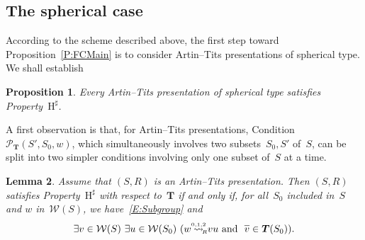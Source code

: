 \documentclass{amsart}
\numberwithin{equation}{section}
\theoremstyle{plain}
\newtheorem{prop}{Proposition}[section]
\newtheorem{lemm}[prop]{Lemma}
\theoremstyle{definition}
\begin{document}
\subsection{The spherical case}
\label{SS:SphericalPP}

According to the scheme described above, the first step toward Proposition~\ref{P:FCMain} is to consider Artin--Tits presentations of spherical type. We shall establish

\begin{prop}
\label{P:SphericalP}
Every Artin--Tits presentation of spherical type satisfies Property~${{\mathrm{H}}^\sharp}$.
\end{prop}

A first observation is that, for Artin--Tits presentations, Condition~${\mathcal{P}}_{\boldsymbol{T}}({S}', {S}_0, {w})$, which simultaneously involves two subsets~${S}_0, {S}'$ of~${S}$, can be split into two simpler conditions involving only one subset of~${S}$ at a time.

\begin{lemm}
\label{L:Propp}
Assume that $({S}, {R})$ is an Artin--Tits presentation. Then $({S}, {R})$ satisfies Property~${{\mathrm{H}}^\sharp}$ with respect to~${\boldsymbol{T}}$ if and only if, for all~${S}_0$ included in~${S}$ and ${w}$ in~${\mathcal{W}({S})}$, we have~\eqref{E:Subgroup} and
\begin{equation}
\label{E:Proppp}
\exists {v} \in {\mathcal{W}({S})} \ \exists {u} \in {\mathcal{W}({{S}_0})} \ ({w} {\mathrel{{\mathrel{\overset{\scriptscriptstyle 0,1,2}{\rightsquigarrow}}}_{\hspace{-0.9ex}{\scriptscriptstyle R}}}} {v} {u} \mbox{\ and \ } {\overline{\vrule width0pt height5pt{v}}} \in {\boldsymbol{T}}({S}_0)).
\end{equation}
\end{lemm}
\end{document}
